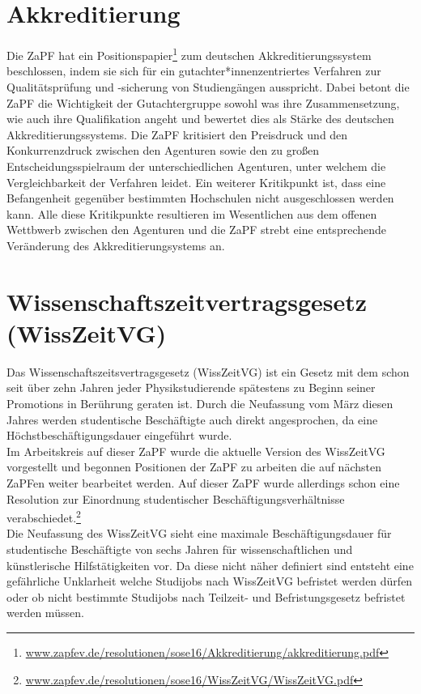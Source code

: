 \section*{Akkreditierung}
Die ZaPF hat ein Positionspapier\footnote{\href{http://www.zapfev.de/resolutionen/sose16/Akkreditierung/akkreditierung.pdf}{\url{www.zapfev.de/resolutionen/sose16/Akkreditierung/akkreditierung.pdf}}} zum deutschen Akkreditierungssystem beschlossen, 
indem sie sich für ein gutachter*innenzentriertes Verfahren zur Qualitätsprüfung und -sicherung 
von Studiengängen ausspricht. Dabei betont die ZaPF die Wichtigkeit der Gutachtergruppe sowohl 
was ihre Zusammensetzung, wie auch ihre Qualifikation angeht und bewertet dies als Stärke 
des deutschen Akkreditierungssystems. Die ZaPF kritisiert den Preisdruck und den Konkurrenzdruck 
zwischen den Agenturen sowie den zu großen Entscheidungsspielraum der unterschiedlichen Agenturen, 
unter welchem die Vergleichbarkeit der Verfahren leidet. Ein weiterer Kritikpunkt 
ist, dass eine Befangenheit gegenüber bestimmten Hochschulen nicht ausgeschlossen werden kann. 
Alle diese Kritikpunkte resultieren im Wesentlichen aus dem offenen Wettbwerb zwischen 
den Agenturen und die ZaPF strebt eine entsprechende Veränderung des Akkreditierungsystems an.

\section*{Wissenschaftszeitvertragsgesetz (WissZeitVG)}

Das Wissenschaftszeitsvertragsgesetz (WissZeitVG) ist ein Gesetz mit dem schon seit über 
zehn Jahren jeder Physikstudierende spätestens zu Beginn seiner Promotions in Berührung geraten ist. 
Durch die Neufassung vom März diesen Jahres werden studentische Beschäftigte auch direkt angesprochen, 
da eine Höchstbeschäftigungsdauer eingeführt wurde.\\

Im Arbeitskreis auf dieser ZaPF wurde die aktuelle Version des WissZeitVG vorgestellt und 
begonnen Positionen der ZaPF zu arbeiten die auf nächsten ZaPFen weiter bearbeitet werden. 
Auf dieser ZaPF wurde allerdings schon eine Resolution zur Einordnung studentischer Beschäftigungsverhältnisse verabschiedet.\footnote{\href{http://www.zapfev.de/resolutionen/sose16/WissZeitVG/WissZeitVG.pdf}{\url{www.zapfev.de/resolutionen/sose16/WissZeitVG/WissZeitVG.pdf}}}\\

Die Neufassung des WissZeitVG sieht eine maximale Beschäftigungsdauer für studentische 
Beschäftigte von sechs Jahren für wissenschaftlichen und künstlerische Hilfstätigkeiten vor. 
Da diese nicht näher definiert sind entsteht eine gefährliche Unklarheit welche Studijobs nach 
WissZeitVG befristet werden dürfen oder ob nicht bestimmte Studijobs nach Teilzeit- und Befristungsgesetz befristet werden müssen.\\

